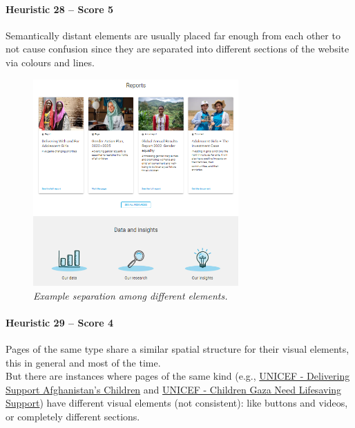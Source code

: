 \paragraph*{Heuristic 28 – Score 5}
Semantically distant elements are usually placed far enough from each other to not cause confusion since they are separated into different sections of the website via colours and lines.
\begin{figure}[h]
	\centering
	\begin{center}
		\includegraphics[width=0.7\textwidth]{Picture27.png}
	\end{center}
	\captionsetup{font=small}
	\caption{\textit{Example separation among different elements.}}
	\label{fig:label27}
\end{figure}

\newpage

\paragraph*{Heuristic 29 – Score 4}
Pages of the same type share a similar spatial structure for their visual elements, this in general and most of the time.\\
But there are instances where pages of the same kind (e.g., \href{https://www.unicef.org/emergencies/delivering-support-afghanistans-children}{UNICEF - Delivering Support Afghanistan's Children} and \href{https://www.unicef.org/emergencies/children-gaza-need-lifesaving-support}{UNICEF - Children Gaza Need Lifesaving Support}) have different visual elements (not consistent): like buttons and videos, or completely different sections.
